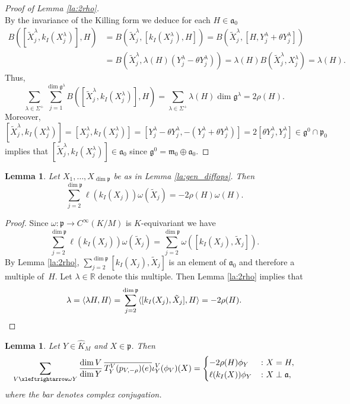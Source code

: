 \documentclass[JEP,XML,SOM,NoFloatCountersInSection,Unicode,published]{cedram}
\newtheorem{lemma}[theorem]{Lemma}
\theoremstyle{definition}
\newcommand{\lraomega}{\ensuremath{\xleftrightarrow\omega}}
\newcommand{\mf}[1]{\ensuremath{\mathfrak{#1}}}
\newcommand{\rhoa}{\ensuremath{\rho}}
\newcommand{\R}{\ensuremath{\mathbb{R}}}
\newcommand{\Ik}[1]{\ensuremath{k_I(#1)}}
\begin{document}
\begin{proof}[Proof of Lemma \ref{la:2rho}]
\[\]
By the invariance of the Killing form we deduce for each $H\in\mf a_0$
\begin{align*}
B([\tilde X_j^\lambda,\Ik{X_j^\lambda}],H)&=B(\tilde X_j^\lambda,[\Ik{X_j^\lambda},H])=B(\tilde X_j^\lambda,[H,Y_j^\lambda+\theta Y_j^\lambda])\\
&=B(\tilde X_j^\lambda,\lambda(H)(Y_j^\lambda-\theta Y_j^\lambda))=\lambda(H)B(\tilde X_j^\lambda,X_j^\lambda)=\lambda(H).
\end{align*}
Thus,
\[
\sum_{\lambda\in\Sigma^+}\sum_{j=1}^{\dim\mf g^\lambda}B([\tilde X_j^\lambda,\Ik{X_j^\lambda}],H)=\sum_{\lambda\in\Sigma^+}\lambda(H)\dim\mf g^\lambda=2\rhoa(H).
\]
Moreover,
\[
[\tilde X_j^\lambda,\Ik{X_j^\lambda}]=[X_j^\lambda,\Ik{X_j^\lambda}]=[Y_j^\lambda-\theta Y_j^\lambda,-(Y_j^\lambda+\theta Y_j^\lambda)]=2[\theta Y_j^\lambda,Y_j^\lambda]\in\mf g^0\cap\mf p_0
\]
implies that $[\tilde X_j^\lambda,\Ik{X_j^\lambda}]\in\mf a_0$ since $\mf g^0=\mf m_0\oplus\mf a_0$.
\end{proof}

\begin{lemma}\label{la:2rho_rank1}
Let $X_1,\ldots,X_{\dim\mf p}$ be as in Lemma \ref{la:gen_diffops}. Then
\[
\sum_{j=2}^{\dim\mf p}\ell(\Ik{X_j})\omega(\tilde X_j)=-2\rhoa(H)\omega(H).
\]
\end{lemma}

\begin{proof}
Since $\omega:\mf p\to C^\infty(K/M)$ is $K$-equivariant we have
\[
\sum_{j=2}^{\dim\mf p}\ell(\Ik{X_j})\omega(\tilde X_j)=\sum_{j=2}^{\dim\mf p}\omega([\Ik{X_j},\tilde X_j]).
\]
By Lemma \ref{la:2rho}, $\sum_{j=2}^{\dim\mf p}[\Ik{X_j},\tilde X_j]$ is an element of $\mf a_0$ and therefore a multiple of~$H$. Let $\lambda\in\R$ denote this multiple. Then Lemma \ref{la:2rho} implies that
\[
\lambda=\langle\lambda H,H\rangle=\sum_{j=2}^{\dim\mf p}\langle[\Ik{X_j},\tilde X_j],H\rangle=-2\rhoa(H).\qedhere
\]
\end{proof}

\begin{lemma}\label{la:p_second_part_local}
Let $Y\in\hat K_M$ and $X\in\mf p$. Then
\[
\sum_{V\lraomega Y}\frac{\dim V}{\dim Y}\,\overline{T_{Y}^V(p_{V,-\rhoa})(e)}\iota_Y^V(\phi_V)(X)=
\begin{cases}
-2\rhoa(H)\phi_Y&\colon X=H,\\
\ell(\Ik{X})\phi_Y&\colon X\perp\mf a,
\end{cases}
\]
where the bar denotes complex conjugation.
\end{lemma}
\end{document}
